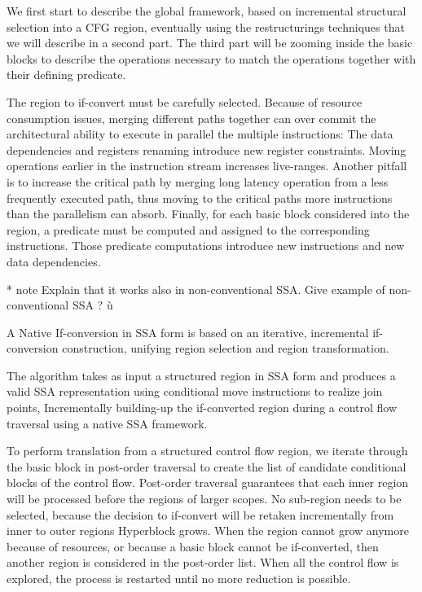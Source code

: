We first start to describe the global framework, based on incremental structural selection into a CFG region, eventually using the restructurings techniques that we will describe in a second part. The third part will be zooming inside the basic blocks to describe the operations necessary to match the operations together with their defining predicate.

The region to if-convert must be carefully selected. Because of resource consumption issues, merging different paths together can over commit the architectural ability to execute in parallel the multiple instructions: The data dependencies and registers renaming introduce new register constraints. Moving operations earlier in the instruction stream increases live-ranges. 
Another pitfall is to increase the critical path by merging long latency operation from a less frequently executed path, thus moving to the critical paths more instructions than the parallelism can absorb.
Finally, for each basic block considered into the region, a predicate must be computed and assigned to the corresponding instructions. Those predicate computations introduce new instructions and new data dependencies.

* note Explain that it works also in non-conventional SSA. Give example of non-conventional SSA ? ù

A Native If-conversion in SSA form is based on an iterative, incremental if-conversion construction, unifying region selection and region transformation. 

The algorithm takes as input a structured region in SSA form and produces a valid SSA representation using conditional move instructions to realize join points, Incrementally building-up the if-converted region during a control flow traversal using a native SSA framework.

To perform translation from a structured control flow region, we iterate through the basic block in post-order traversal to create the list of candidate conditional blocks of the control flow. Post-order traversal guarantees that each inner region will be processed before the regions of larger scopes. No sub-region needs to be selected, because the decision to if-convert will be retaken incrementally from inner to outer regions Hyperblock grows. When the region cannot grow anymore because of resources, or because a basic block cannot be if-converted, then another region is considered in the post-order list. When all the control flow is explored, the process is restarted until no more reduction is possible.


